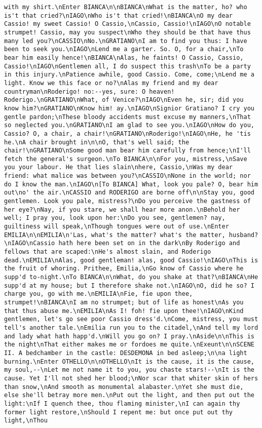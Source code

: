 \begin{verbatim}
with my shirt.\nEnter BIANCA\n\nBIANCA\nWhat is the matter, ho? who is't that cried?\nIAGO\nWho is't that cried!\nBIANCA\nO my dear Cassio! my sweet Cassio! O Cassio,\nCassio, Cassio!\nIAGO\nO notable strumpet! Cassio, may you suspect\nWho they should be that have thus many led you?\nCASSIO\nNo.\nGRATIANO\nI am to find you thus: I have been to seek you.\nIAGO\nLend me a garter. So. O, for a chair,\nTo bear him easily hence!\nBIANCA\nAlas, he faints! O Cassio, Cassio, Cassio!\nIAGO\nGentlemen all, I do suspect this trash\nTo be a party in this injury.\nPatience awhile, good Cassio. Come, come;\nLend me a light. Know we this face or no?\nAlas my friend and my dear countryman\nRoderigo! no:--yes, sure: O heaven! Roderigo.\nGRATIANO\nWhat, of Venice?\nIAGO\nEven he, sir; did you know him?\nGRATIANO\nKnow him! ay.\nIAGO\nSignior Gratiano? I cry you gentle pardon;\nThese bloody accidents must excuse my manners,\nThat so neglected you.\nGRATIANO\nI am glad to see you.\nIAGO\nHow do you, Cassio? O, a chair, a chair!\nGRATIANO\nRoderigo!\nIAGO\nHe, he 'tis he.\nA chair brought in\n\nO, that's well said; the chair!\nGRATIANO\nSome good man bear him carefully from hence;\nI'll fetch the general's surgeon.\nTo BIANCA\n\nFor you, mistress,\nSave you your labour. He that lies slain\nhere, Cassio,\nWas my dear friend: what malice was between you?\nCASSIO\nNone in the world; nor do I know the man.\nIAGO\n[To BIANCA] What, look you pale? O, bear him out\no' the air.\nCASSIO and RODERIGO are borne off\n\nStay you, good gentlemen. Look you pale, mistress?\nDo you perceive the gastness of her eye?\nNay, if you stare, we shall hear more anon.\nBehold her well; I pray you, look upon her:\nDo you see, gentlemen? nay, guiltiness will speak,\nThough tongues were out of use.\nEnter EMILIA\n\nEMILIA\n'Las, what's the matter? what's the matter, husband?\nIAGO\nCassio hath here been set on in the dark\nBy Roderigo and fellows that are scaped:\nHe's almost slain, and Roderigo dead.\nEMILIA\nAlas, good gentleman! alas, good Cassio!\nIAGO\nThis is the fruit of whoring. Prithee, Emilia,\nGo know of Cassio where he supp'd to-night.\nTo BIANCA\n\nWhat, do you shake at that?\nBIANCA\nHe supp'd at my house; but I therefore shake not.\nIAGO\nO, did he so? I charge you, go with me.\nEMILIA\nFie, fie upon thee, strumpet!\nBIANCA\nI am no strumpet; but of life as honest\nAs you that thus abuse me.\nEMILIA\nAs I! foh! fie upon thee!\nIAGO\nKind gentlemen, let's go see poor Cassio dress'd.\nCome, mistress, you must tell's another tale.\nEmilia run you to the citadel,\nAnd tell my lord and lady what hath happ'd.\nWill you go on? I pray.\nAside\n\nThis is the night\nThat either makes me or fordoes me quite.\nExeunt\n\nSCENE II. A bedchamber in the castle: DESDEMONA in bed asleep;\n\na light burning.\nEnter OTHELLO\n\nOTHELLO\nIt is the cause, it is the cause, my soul,--\nLet me not name it to you, you chaste stars!--\nIt is the cause. Yet I'll not shed her blood;\nNor scar that whiter skin of hers than snow,\nAnd smooth as monumental alabaster.\nYet she must die, else she'll betray more men.\nPut out the light, and then put out the light:\nIf I quench thee, thou flaming minister,\nI can again thy former light restore,\nShould I repent me: but once put out thy light,\nThou 
\end{verbatim}
